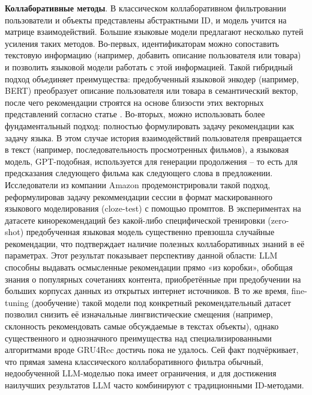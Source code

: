\textbf{Коллаборативные методы}. В классическом коллаборативном фильтровании пользователи и объекты представлены абстрактными ID, и модель учится на матрице взаимодействий. Большие языковые модели предлагают несколько путей усиления таких методов. Во-первых, идентификаторам можно сопоставить текстовую информацию (например, добавить описание пользователя или товара) и позволить языковой модели работать с этой информацией. Такой гибридный подход объединяет преимущества: предобученный языковой энкодер (например, BERT) преобразует описание пользователя или товара в семантический вектор, после чего рекомендации строятся на основе близости этих векторных представлений согласно статье \citep{zhao2024recommendersystemsin}. Во-вторых, можно использовать более фундаментальный подход: полностью формулировать задачу рекомендации как задачу языка. В этом случае история взаимодействий пользователя превращается в текст (например, последовательность просмотренных фильмов), а языковая модель, GPT-подобная, используется для генерации продолжения – то есть для предсказания следующего фильма как следующего слова в предложении.  Исследователи из компании Amazon \citep{zhang2021languagemodelsasrecommendersystemsevaluations} продемонстрировали такой подход, реформулировав задачу рекоммендации сессии в формат маскированного языкового моделирования (cloze-test) с помощью промптов. В экспериментах на датасете кинорекомендаций без какой-либо специфической тренировки (zero-shot) предобученная языковая модель существенно превзошла случайные рекомендации, что подтверждает наличие полезных коллаборативных знаний в её параметрах. Этот результат показывает перспективу данной области: LLM способны выдавать осмысленные рекомендации прямо «из коробки», обобщая знания о популярных сочетаниях контента, приобретённые при предобучении на больших корпусах данных из открытых интернет источников. В то же время, fine-tuning (дообучение) такой модели под конкретный рекомендательный датасет позволил снизить её изначальные лингвистические смещения (например, склонность рекомендовать самые обсуждаемые в текстах объекты), однако существенного и однозначного преимущества над специализированными алгоритмами вроде GRU4Rec достичь пока не удалось. Сей факт подчёркивает, что прямая замена классического коллаборативного фильтра обычный, недообученной LLM-моделью пока имеет ограничения, и для достижения наилучших результатов LLM часто комбинируют с традиционными ID-методами.

